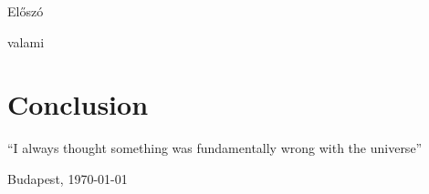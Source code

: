 \documentclass[../main.tex]{subfiles}
\begin{document}
{\Large{Előszó}}

valami

\section{Conclusion}
``I always thought something was fundamentally wrong with the universe'' \citep{adams1995hitchhiker}


Budapest, \today

\myname
\end{document}
